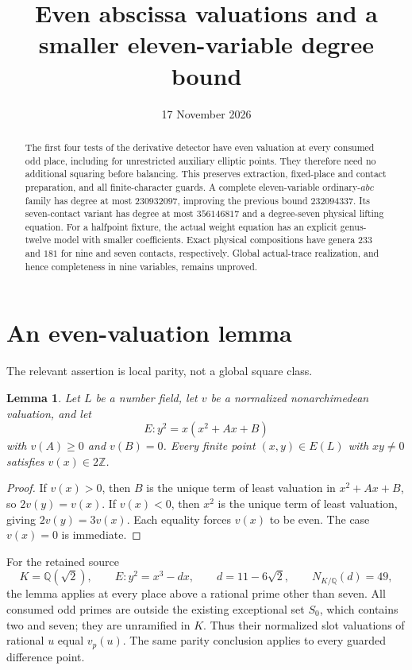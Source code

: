 \documentclass[11pt,a4paper]{article}
\title{Even abscissa valuations and a smaller eleven-variable degree bound}
\author{}\date{17 November 2026}
\newtheorem{lemma}[theorem]{Lemma}
\newcommand{\Q}{\mathbb Q}\newcommand{\Z}{\mathbb Z}
\begin{document}
\maketitle
\begin{abstract}
The first four tests of the derivative detector have even valuation
at every consumed odd place, including for unrestricted auxiliary
elliptic points. They therefore need no additional squaring before
balancing. This preserves extraction, fixed-place and contact preparation,
and all finite-character guards. A complete eleven-variable ordinary-$abc$
family has degree at most $230932097$, improving the previous bound
$232094337$. Its seven-contact variant has degree at most $356146817$
and a degree-seven physical lifting equation. For a halfpoint fixture,
the actual weight equation has an explicit genus-twelve model with
smaller coefficients. Exact physical compositions have genera $233$
and $181$ for nine and seven contacts, respectively. Global actual-trace
realization, and hence completeness in nine variables, remains unproved.
\end{abstract}

\section{An even-valuation lemma}
The relevant assertion is local parity, not a global square class.
\begin{lemma}\label{lem:general}
Let $L$ be a number field, let $v$ be a normalized nonarchimedean
valuation, and let
\[
                   E:y^2=x(x^2+A x+B)
\]
with $v(A)\ge0$ and $v(B)=0$. Every finite point $(x,y)\in E(L)$
with $xy\ne0$ satisfies $v(x)\in2\Z$.
\end{lemma}
\begin{proof}
If $v(x)>0$, then $B$ is the unique term of least valuation in
$x^2+A x+B$, so $2v(y)=v(x)$. If $v(x)<0$, then $x^2$ is the
unique term of least valuation, giving $2v(y)=3v(x)$. Each equality
forces $v(x)$ to be even. The case $v(x)=0$ is immediate.
\end{proof}

For the retained source
\[
 K=\Q(\sqrt2),\qquad E:y^2=x^3-dx,\qquad
 d=11-6\sqrt2,\qquad N_{K/\Q}(d)=49,
\]
the lemma applies at every place above a rational prime other than
seven. All consumed odd primes are outside the existing exceptional
set $S_0$, which contains two and seven; they are unramified in $K$.
Thus their normalized slot valuations of rational $u$ equal $v_p(u)$.
The same parity conclusion applies to every guarded difference point.
\end{document}
